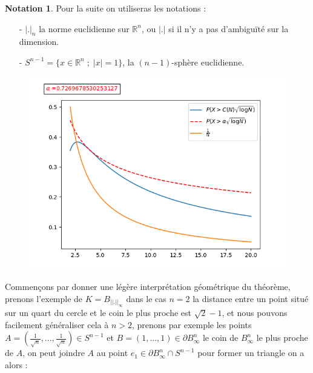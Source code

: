 \documentclass[12pt]{article}
\theoremstyle{definition}
\newtheorem*{notation}{Notation}
\begin{document}
\begin{notation}
	Pour la suite on utiliseras les notations : 
	\begin{enumerate}
		\item[-] $|.|_n$ la norme euclidienne sur $\mathbb{R}^n$, ou $|.|$ si il n'y a pas d'ambiguïté sur la dimension.
		\item[-] $S^{n-1} = \big\{x\in \mathbb{R}^n\; ;\; |x|=1\big\}$, la $(n-1)$-sphère euclidienne. 
	\end{enumerate}
\end{notation}
\begin{figure}
	\centering
	\vspace{-3mm}
	\includegraphics[scale=0.4]{figure_1.png}
\end{figure}

Commençons par donner une légère interprétation géométrique du théorème, prenons l'exemple de $K = B_{||.||_\infty}$ dans le cas $n=2$ la distance entre un point situé sur un quart du cercle et le coin le plus proche est $\sqrt{2}-1$, et nous pouvons facilement généraliser cela à $n>2$, prenons par exemple les points $A =(\frac{1}{\sqrt{n}},...,\frac{1}{\sqrt{n}})\in S^{n-1}$ et $B = (1,...,1)\in \partial B_\infty^n$ le coin de $B_\infty^n$ le plus proche de $A$, on peut joindre $A$ au point $e_1\in \partial B_\infty^n\cap S^{n-1}$ pour former un triangle on a alors :
\end{document}
